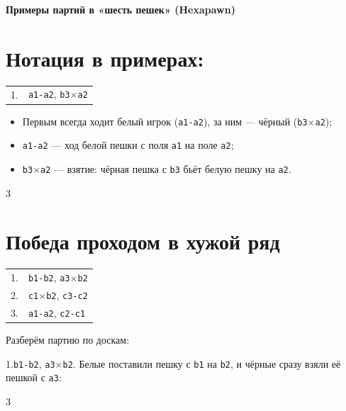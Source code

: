\documentclass[12pt,a4paper]{article}
\begin{document}
\begin{center}
{\LARGE\bfseries Примеры партий в «шесть пешек» (Hexapawn)}\\[0.6em]
\end{center}


\section*{Нотация в примерах:}

\begin{center}
\begin{tabular}{ll}
1. & \texttt{a1-a2}, \texttt{b3$\times$a2} \\
\end{tabular}
\end{center}


\begin{itemize}[nosep]
\item Первым всегда ходит белый игрок (\texttt{a1-a2}), за ним --- чёрный (\texttt{b3$\times$a2});
\item \texttt{a1-a2} --- ход белой пешки с поля \texttt{a1} на поле \texttt{a2};
\item \texttt{b3$\times$a2} --- взятие: чёрная пешка с \texttt{b3} бьёт белую пешку на \texttt{a2}.
\end{itemize}

\begin{multicols}{3}
\columnbreak \par
{}
\columnbreak \par
{}
\end{multicols}

\newpage


\section*{Победа проходом в хужой ряд}

\begin{center}
\begin{tabular}{ll}
1. & \texttt{b1-b2}, \texttt{a3$\times$b2} \\
2. & \texttt{c1$\times$b2}, \texttt{c3-c2} \\
3. & \texttt{a1-a2}, \texttt{c2-c1}
\end{tabular}
\end{center}

Разберём партию по доскам:

1.\texttt{b1-b2}, \texttt{a3$\times$b2}.
Белые поставили пешку с \texttt{b1} на \texttt{b2}, и чёрные сразу взяли её пешкой с \texttt{a3}:
\begin{multicols}{3}
\columnbreak \par
{}
\columnbreak \par
{}
\end{multicols}
\end{document}
